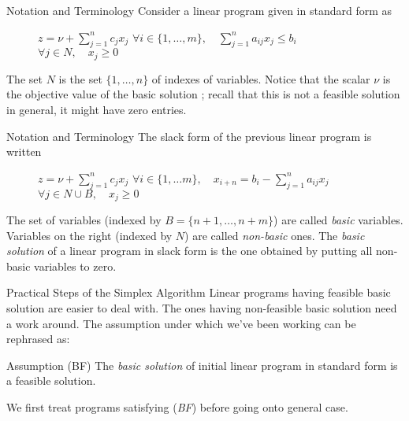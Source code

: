 \documentclass[aspectratio = 169]{beamer}
\begin{document}
\begin{frame}{Notation and Terminology}
    Consider a linear program given in standard form as
    \begin{figure}
        \begin{linearProgG}{
            ${\displaystyle z = \nu + \sum_{j=1}^n c_jx_j}$
            }{
            ${\displaystyle \forall i \in \{ 1, \ldots, m \}, \quad \sum_{j=1}^n a_{ij}x_j \leq b_i}$
            }{
            $\forall j \in N, \quad x_j \geq 0$
            }
        \end{linearProgG}
    \end{figure}
    The set $N$ is the set $\{ 1, \ldots, n \}$ of indexes of
    variables. Notice that the scalar $\nu$ is the objective value of
    the basic solution ; recall that this is not a feasible solution
    in general, it might have zero entries.
\end{frame}

\begin{frame}{Notation and Terminology}
    The slack form of the previous linear program is written
    \begin{figure}
        \begin{linearProgG}{
            ${\displaystyle z = \nu + \sum_{j=1}^n c_jx_j}$
            }{
            ${\displaystyle \forall i \in \{1, \ldots m \}, \quad x_{i + n} = b_i - \sum_{j=1}^n a_{ij}x_j}$
            }{
            $\forall j \in N\cup B, \quad x_j \geq 0$
            }
        \end{linearProgG}
    \end{figure}
    The set of variables (indexed by $B = \{n + 1, \ldots, n + m \}$)
    are called \emph{basic} variables. Variables on the right (indexed
    by $N$) are called \emph{non-basic} ones. The \emph{basic
      solution} of a linear program in slack form is the one obtained
    by putting all non-basic variables to zero.
\end{frame}

\begin{frame}{Practical Steps of the Simplex Algorithm}
  Linear programs having feasible basic solution are easier to deal
  with. The ones having non-feasible basic solution need a work
  around. The assumption under which we've been working can be
  rephrased as:
  \begin{alertblock}{Assumption (BF)}
    The \textit{basic solution} of initial linear program in
    standard form is a feasible solution.
  \end{alertblock}
  We first treat programs satisfying (\emph{BF}) before going onto
  general case.
\end{frame}
\end{document}
